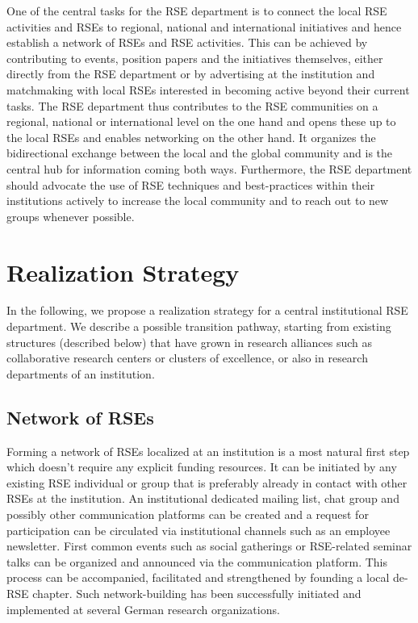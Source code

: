 \documentclass{article}
\begin{document}
One of the central tasks for the RSE department is to connect the local RSE activities and RSEs to regional, national and international initiatives and hence establish a network of RSEs and RSE activities.
This can be achieved by contributing to events, position papers and the initiatives themselves,
either directly from the RSE department or by advertising at the institution and matchmaking with local RSEs interested in becoming active beyond their current tasks.
The RSE department thus contributes to the RSE communities on a regional, national or international level on the one hand and opens these up to the local RSEs and enables networking on the other hand.
It organizes the bidirectional exchange between the local and the global community and is the central hub for information coming both ways.
Furthermore, the RSE department should advocate the use of RSE techniques and best-practices within their institutions actively to increase the local community and to reach out to new groups whenever possible.

\section{Realization Strategy}

In the following, we propose a realization strategy for a central institutional RSE department.
We describe a possible transition pathway, starting from existing structures (described below) that have grown in research alliances such as collaborative research centers or clusters of excellence,
or also in research departments of an institution.

\subsection{Network of RSEs}

Forming a network of RSEs localized at an institution is a most natural first step which doesn’t require any explicit funding resources.
It can be initiated by any existing RSE individual or group that is preferably already in contact with other RSEs at the institution.
An institutional dedicated mailing list, chat group and possibly other communication platforms can be created and a request for participation can be circulated via institutional channels such as an employee newsletter.
First common events such as social gatherings or RSE-related seminar talks can be organized and announced via the communication platform.
This process can be accompanied, facilitated and strengthened by founding a local de-RSE chapter.
Such network-building has been successfully initiated and implemented at several German research organizations.
\end{document}
